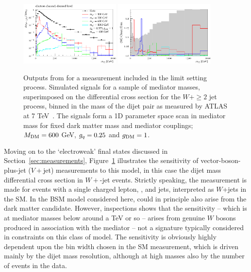 \documentclass[floatfix]{article}
\begin{document}
\begin{figure}
\centering
      \includegraphics[width=0.45\textwidth]{images/atlaswjet/fullrange/ATLASWjet.pdf}
      \includegraphics[width=0.45\textwidth]{images/atlaswjet/ratio/ATLASwjet_ratio.pdf}
\caption{Outputs from \rivet for a measurement included in the limit setting process. Simulated signals for a sample of mediator masses, superimposed on 
the differential cross section for the $W+\geq2$ jet process, binned in the mass of the dijet pair as measured by ATLAS at 7 TeV~\cite{Aad:2014qxa}.
The signals form a 1D parameter space scan in mediator mass for fixed dark matter mass and mediator couplings; $M_{\rm DM}=600$ GeV, $g_{q}=0.25$ and $g_{\rm DM} = 1$.}
\label{fig:ATLASwjet}
\end{figure}

Moving on to the `electroweak' final states discussed in Section~\ref{sec:measurements}, Figure~\ref{fig:ATLASwjet} illustrates the sensitivity of vector-boson-plus-jet
($V+$jet) measurements to this model, in this case the dijet mass differential cross section in $W+$-jet events. Strictly speaking, the measurement is made for
events with a single charged lepton, \MET, and jets, interpreted as $W$+jets in the SM. In the BSM model considered here, \MET could in principle 
also arise from the dark matter candidate. However, inspections shows that the sensitivity -- which is at mediator masses below around a TeV or so -- arises 
from genuine $W$ bosons produced in association with the mediator -- not a signature typically considered in constraints on this class of model. The sensitivity
is obviously highly dependent upon the bin width chosen in the SM measurement, which is driven mainly by the dijet mass resolution, although at high masses also by
the number of events in the data.
\end{document}
